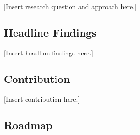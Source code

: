 %

[Insert research question and approach here.]

\subsection{Headline Findings}
\label{sec:intro_findings}


[Insert headline findings here.]

\subsection{Contribution}
\label{sec:intro_contribution}


[Insert contribution here.]

\subsection{Roadmap}
\label{sec:intro_roadmap}

